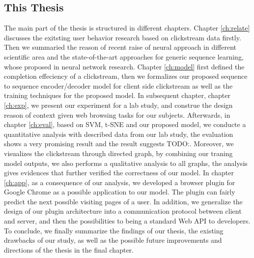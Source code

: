\subsection{This Thesis}



The main part of the thesis is structured in different chapters.
Chapter \ref{ch:relate} discusses the exitsting user behavior research based on clickstream data firstly.
Then we summaried the reason of recent raise of neural approach in different scientific area and the 
state-of-the-art approaches for generic sequence learning, whose proposed in neural network research.
Chapter \ref{ch:model} first defined the completion effeciency of a clickstream, then we
formalizes our proposed sequence to sequence encoder/decoder model for client side
clickstream as well as the training techniques for the proposed model.
In subsequent chapter, chapter \ref{ch:exp}, we present our experiment for a lab study,
and construe the design reason of context given web browsing tasks for our subjects.
Afterwards, in chapter \ref{ch:eval}, based on SVM, t-SNE and our proposed model, 
we conducte a quantitative analysis with described data from our lab study, 
the evaluation shows a very promising result and the result suggests TODO:. %
Moreover, we visualizes the clickstream through directed graph, by combining our traning model outputs,
we also performs a qualitative analysis to all graphs, the analysis gives evidences that further 
verified the correctness of our model.
In chapter \ref{ch:app}, as a consequence of our analysis, we developed a browser plugin 
for Google Chrome as a possible application to our model. The plugin can fairly predict 
the next possible visiting pages of a user. In addition, we generalize the design of
our plugin architecture into a communication protocol between client and server,
and then the possibilities to being a standard Web API to developers.
To conclude, we finally summarize the findings of our thesis, 
the existing drawbacks of our study, as well as the possible 
future improvements and directions of the thesis in the final chapter.
\cleardoublepage